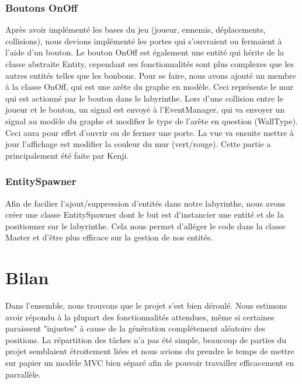 \documentclass[a4paper]{article}
\begin{document}
\subsubsection{Boutons OnOff}
Après avoir implémenté les bases du jeu (joueur, ennemis, déplacements,
collisions), nous devions implémenté les portes qui s'ouvraient ou fermaient
à l'aide d'un bouton. Le bouton OnOff est également une entité qui hérite
de la classe abstraite Entity, cependant ses fonctionnalités sont plus
complexes que les autres entités telles que les bonbons. Pour se faire, nous
avons ajouté un membre à la classe OnOff, qui est une arête du graphe en modèle.
Ceci représente le mur qui est actionné par le bouton dans le labyrinthe. Lors
d'une collision entre le joueur et le bouton, un signal est envoyé à
l'EventManager, qui va envoyer un signal au modèle du graphe et modifier le
type de l'arête en question (WallType). Ceci aura pour effet d'ouvrir ou de
fermer une porte. La vue va ensuite mettre à jour l'affichage est modifier la
couleur du mur (vert/rouge). Cette partie a principalement été faite par Kenji.

\subsubsection{EntitySpawner}
Afin de facilier l'ajout/suppression d'entités dans notre labyrinthe, nous avons
créer une classe EntitySpawner dont le but est d'instancier une entité et de
la positionner sur le labyrinthe. Cela nous permet d'alléger le code dans la
classe Master et d'être plus efficace sur la gestion de nos entités.


\newpage
\section{Bilan}
Dans l'ensemble, nous trouvons que le projet s'est bien déroulé. Nous estimons
avoir répondu à la plupart des fonctionnalités attendues, même si certaines
paraissent "injustes" à cause de la génération complétement aléatoire des
positions.
La répartition des tâches n'a pas été simple, beaucoup de parties du projet
semblaient étroitement liées et nous avions du prendre le temps de mettre sur
papier un modèle MVC bien séparé afin de pouvoir travailler efficacement
en parrallèle.

\end{document}
